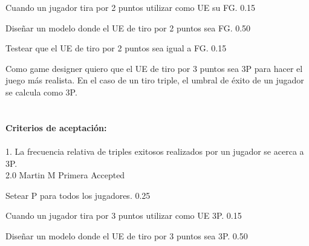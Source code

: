 		{Cuando un jugador tira por 2 puntos utilizar como UE su FG.} %
		{} %
		{0.15} %
		{} %
		{} %
		{} %

		{Diseñar un modelo donde el UE de tiro por 2 puntos sea FG.} %
		{} %
		{0.50} %
		{} %
		{} %
		{} %

		{Testear que el UE de tiro por 2 puntos sea igual a FG.} %
		{} %
		{0.15} %
		{} %
		{} %
		{} %

\vspace{20pt}

	{Como game designer quiero que el UE de tiro por 3 puntos sea 3P para hacer el juego m\'as realista.} %
	{En el caso de un tiro triple, el umbral de éxito de un jugador se calcula como 3P. \\
  \\
  \\
\textbf{Criterios de aceptación:}\\
  \\
1. La frecuencia relativa de triples exitosos realizados por un jugador se acerca a 3P. \\
} %
	{} %
	{2.0} %
	{Martin M} %
	{Primera} %
	{Accepted} %

		{Setear P para todos los jugadores.
} %
		{} %
		{0.25} %
		{} %
		{} %
		{} %

		{Cuando un jugador tira por 3 puntos utilizar como UE 3P.} %
		{} %
		{0.15} %
		{} %
		{} %
		{} %

		{Diseñar un modelo donde el UE de tiro por 3 puntos sea 3P.} %
		{} %
		{0.50} %
		{} %
		{} %
		{} %

